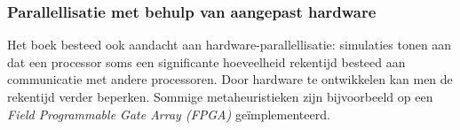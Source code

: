 \subsubsection{Parallellisatie met behulp van aangepast hardware}
Het boek besteed ook aandacht aan hardware-parallellisatie: simulaties tonen aan dat een processor soms een significante hoeveelheid rekentijd besteed aan communicatie met andere processoren. Door hardware te ontwikkelen kan men de rekentijd verder beperken. Sommige metaheuristieken zijn bijvoorbeeld op een \emph{Field Programmable Gate Array (FPGA)} ge\"implementeerd\cite{conf/glvlsi/HaldarNCB00,conf/fpt/GuntschMSDESS02,journals/gpem/Martin01}.